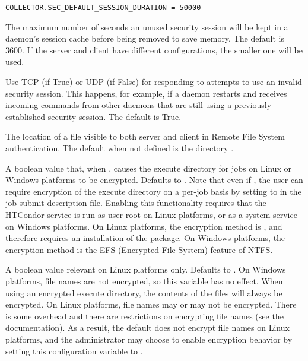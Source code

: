 \begin{description}
\begin{verbatim}
COLLECTOR.SEC_DEFAULT_SESSION_DURATION = 50000
\end{verbatim}

\label{param:SecDefaultSessionLease}
\item[\Macro{SEC\_<access-level>\_SESSION\_LEASE}]
  The maximum number of seconds an unused security session will be
  kept in a daemon's session cache before being removed to save memory.
  The default is 3600.  If the server and client have different
  configurations, the smaller one will be used.

\label{param:SecInvalidateSessionsViaTcp}
\item[\Macro{SEC\_INVALIDATE\_SESSIONS\_VIA\_TCP}]
  Use TCP (if True) or UDP (if False)
  for responding to attempts to use an invalid security session.  This happens,
  for example, if a daemon restarts and receives incoming commands from
  other daemons that are still using a previously established security session.
  The default is True.

\label{param:FSRemoteDir}
\item[\Macro{FS\_REMOTE\_DIR}]
  The location of a file visible to both server and client in
  Remote File System authentication.
  The default when not defined is the directory 
  .

\label{param:EncryptExecuteDirectory}
\item[\Macro{ENCRYPT\_EXECUTE\_DIRECTORY}]
  A boolean value that, when , 
  causes the execute directory for jobs on Linux or Windows platforms to be
  encrypted.
  Defaults to .  
  Note that even if , 
  the user can require encryption of the execute directory on a per-job 
  basis by setting  to  
  in the job submit description file.
  Enabling this functionality requires that the HTCondor service
  is run as user root on Linux platforms,
  or as a system service on Windows platforms.
  On Linux platforms, the encryption method is ,
  and therefore requires an installation of the  package.
  On Windows platforms, the encryption method is the EFS (Encrypted File System)
  feature of NTFS.

\label{param:EncryptExecuteDirectoryFilenames}
\item[\Macro{ENCRYPT\_EXECUTE\_DIRECTORY\_FILENAMES}]
  A boolean value relevant on Linux platforms only.
  Defaults to .
  On Windows platforms, file names are not encrypted,
  so this variable has no effect.  
  When using an encrypted execute directory, 
  the contents of the files will always be encrypted.  
  On Linux platforms, file names may or may not be encrypted. 
  There is some overhead and there are restrictions on encrypting file names
  (see the  documentation).  
  As a result, the default does not encrypt file names on Linux platforms, 
  and the administrator may choose to enable encryption behavior 
  by setting this configuration variable to .


\end{description}
